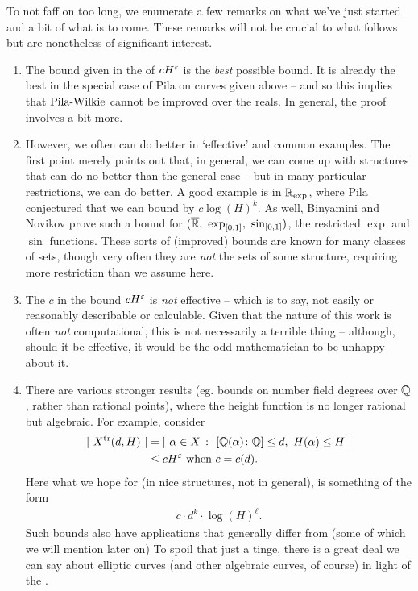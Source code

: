To not faff on too long, we enumerate a few remarks on what we've just started and a bit of what is to come. These remarks will not be crucial to what follows but are nonetheless of significant interest.
\begin{remark}
\begin{enumerate}
  \item The bound given in the \pwt of $\bound[H]$ is the \emph{best} possible bound. It is already the best in the special case of Pila on curves given above -- and so this implies that $\pw$ cannot be improved over the reals. In general, the proof involves a bit more.

  \item However, we often can do better in `effective' and common examples. The first point merely points out that, in general, we can come up with structures that can do no better than the general case -- but in many particular restrictions, we can do better. A good example is in $\R_{\textrm{exp}}$, where Pila conjectured that we can bound by $c \log{(H)^k}$. As well, Binyamini and Novikov \cite{binyamini_wilkies_2017} prove such a bound for $(\overline{\R}, \ \operatorname{exp}_{[0, 1]}, \ \operatorname{sin}_{[0, 1]})$, the restricted $\operatorname{exp}$ and $\operatorname{sin}$ functions. These sorts of (improved) bounds are known for many classes of sets, though very often they are \emph{not} the  sets of some \om structure, requiring more restriction than we assume here.

  \item The $c$ in the bound $\bound$ is \emph{not} effective -- which is to say, not easily or reasonably describable or calculable. Given that the nature of this work is often \emph{not} computational, this is not necessarily a terrible thing -- although, should it be effective, it would be the odd mathematician to be unhappy about it.

  \item There are various stronger results (eg. bounds on number field degrees over $\Q$, rather than rational points), where the height function is no longer rational but algebraic. For example, consider
      \begin{align*}
        \card{ \ \Xtr (d, H) \ } &= \card{ \ \alpha \in X \ \colon \ [\Q(\alpha) \colon \Q] \leq d, \ H(\alpha) \leq H \ } \\
                                 &\leq \bound[H] \textrm{ when } c = c(d).
      \end{align*}
    Here what we hope for (in nice structures, not in general), is something of the form
      \begin{align*}
        c \cdot d^k \cdot \log{(H)}^{\ell}.
      \end{align*}
    Such bounds also have applications that generally differ from \pw (some of which we will mention later on) To spoil that just a tinge, there is a great deal we can say about elliptic curves (and other algebraic curves, of course) in light of the \pwt.


\end{enumerate}
\end{remark}
